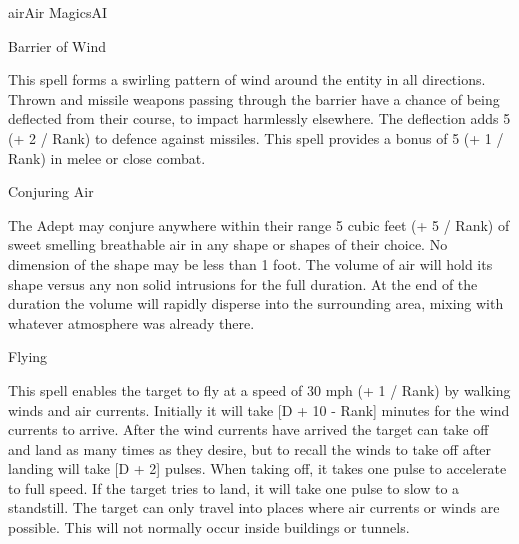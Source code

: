 \begin{college}[2.1]{air}{Air Magics}{AI}
\begin{spell}[S-4]{Barrier of Wind}

\begin{effects}
This spell forms a swirling pattern of wind around the entity in all
directions.  Thrown and missile weapons passing through the barrier
have a chance of being deflected from their course, to impact
harmlessly elsewhere. The deflection adds 5 (+ 2 / Rank) to defence
against missiles. This spell provides a bonus of 5 (+ 1 / Rank) in
melee or close combat.
\end{effects}
\end{spell}

\begin{spell}[S-5]{Conjuring Air}

\begin{effects}
The Adept may conjure anywhere within their range 5 cubic feet (+ 5 /
Rank) of sweet smelling breathable air in any shape or shapes of their
choice. No dimension of the shape may be less than 1 foot. The volume
of air will hold its shape versus any non solid intrusions for the
full duration. At the end of the duration the volume will rapidly
disperse into the surrounding area, mixing with whatever atmosphere
was already there.
\end{effects}
\end{spell}

\begin{spell}[S-6]{Flying}

\begin{effects}
This spell enables the target to fly at a speed of 30 mph (+ 1 / Rank)
by walking winds and air currents. Initially it will take [D + 10 -
Rank] minutes for the wind currents to arrive. After the wind currents
have arrived the target can take off and land as many times as they
desire, but to recall the winds to take off after landing will take
[D + 2] pulses. When taking off, it takes one pulse to accelerate to full
speed. If the target tries to land, it will take one pulse to slow to
a standstill. The target can only travel into places where air
currents or winds are possible. This will not normally occur inside
buildings or tunnels.
\end{effects}
\end{spell}


\end{college}
